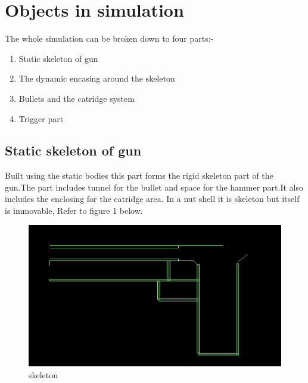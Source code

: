 \documentclass[11pt]{article}
\begin{document}
\section{Objects in simulation}
The whole simulation can be broken down to four parts:-
\begin{enumerate}
\item Static skeleton of gun
\item The dynamic encasing around the skeleton
\item Bullets and the catridge system
\item Trigger part
\end{enumerate}
\subsection{Static skeleton of gun}
Built using the static bodies \cite{box2d}
this part forms the rigid skeleton part of the gun.The part includes tunnel for the bullet and space for the hammer part.It also includes the enclosing for the catridge area. In a nut shell it is skeleton but itself is immovable, Refer to figure 1 below.
\begin{figure}[here]
\begin{center}
\includegraphics[scale=0.3]{../details/images/static.png}
\caption{skeleton}
\end{center}
\end{figure}
\end{document}
